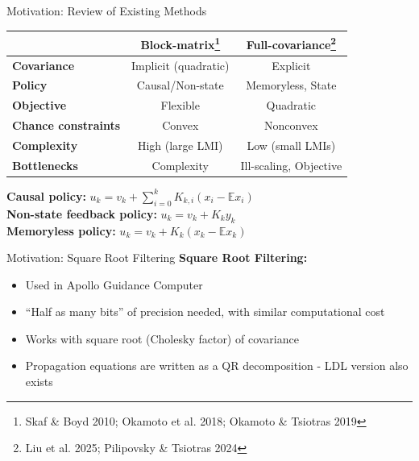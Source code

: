 \documentclass{beamer}
\newcommand{\E}{\mathbb{E}}
\begin{document}
\begin{frame}{Motivation: Review of Existing Methods}
\begin{table}
\centering
\small
\begin{tabular}{lcc}
\toprule
& \textbf{Block-matrix}\footnote{Skaf \& Boyd 2010; Okamoto et al. 2018; Okamoto \& Tsiotras 2019} & \textbf{Full-covariance}\footnote{Liu et al. 2025; Pilipovsky \& Tsiotras 2024} \\
\midrule
\textbf{Covariance} & Implicit (quadratic) & Explicit\\
\textbf{Policy} & Causal/Non-state & Memoryless, State \\
\textbf{Objective} & Flexible & Quadratic \\
\textbf{Chance constraints} & Convex & Nonconvex \\
\textbf{Complexity} & High (large LMI) & Low (small LMIs) \\
\midrule
\textbf{Bottlenecks} & Complexity & Ill-scaling, Objective\\
\bottomrule
\end{tabular}
\end{table}

\textbf{Causal policy:} $u_k = v_k + \sum_{i=0}^k K_{k,i} (x_i - \E{x_i})$\\
\textbf{Non-state feedback policy:} $u_k = v_k + K_k y_k$ \\
\textbf{Memoryless policy:} $u_k = v_k + K_k (x_k - \E{x_k})$
\end{frame}

\begin{frame}{Motivation: Square Root Filtering}
\textbf{Square Root Filtering:}
\begin{itemize}
    \item Used in Apollo Guidance Computer
    \item ``Half as many bits'' of precision needed, with similar computational cost
    \item Works with square root (Cholesky factor) of covariance
    \item Propagation equations are written as a QR decomposition - LDL version also exists
\end{itemize}

\end{frame}
\end{document}
